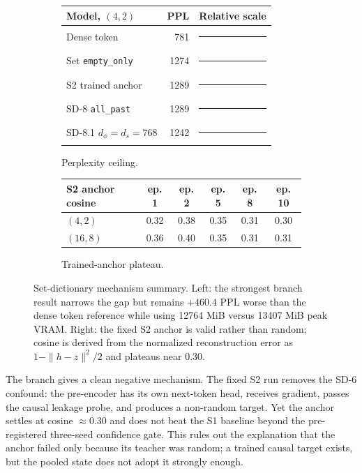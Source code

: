 \documentclass{article}
\theoremstyle{plain}
\theoremstyle{definition}
\theoremstyle{remark}
\begin{document}
\begin{figure}[t]
\centering
\begin{subfigure}{0.48\textwidth}
\centering
\scriptsize
\begin{tabular}{lrc}
\toprule
Model, $(4,2)$ & PPL & Relative scale \\
\midrule
Dense token & 781 & \rule{20mm}{2.5pt} \\
Set \texttt{empty\_only} & 1274 & \rule{33mm}{2.5pt} \\
S2 trained anchor & 1289 & \rule{33mm}{2.5pt} \\
SD-8 \texttt{all\_past} & 1289 & \rule{33mm}{2.5pt} \\
SD-8.1 $d_\phi=d_s=768$ & 1242 & \rule{32mm}{2.5pt} \\
\bottomrule
\end{tabular}
\caption{Perplexity ceiling.}
\end{subfigure}
\hfill
\begin{subfigure}{0.48\textwidth}
\centering
\scriptsize
\begin{tabular}{lccccc}
\toprule
S2 anchor cosine & ep. 1 & ep. 2 & ep. 5 & ep. 8 & ep. 10 \\
\midrule
$(4,2)$ & 0.32 & 0.38 & 0.35 & 0.31 & 0.30 \\
$(16,8)$ & 0.36 & 0.40 & 0.35 & 0.31 & 0.31 \\
\bottomrule
\end{tabular}
\caption{Trained-anchor plateau.}
\end{subfigure}
\caption{Set-dictionary mechanism summary.  Left: the strongest branch result
narrows the gap but remains $+460.4$ PPL worse than the dense token reference
while using 12764 MiB versus 13407 MiB peak VRAM.  Right: the fixed S2 anchor is
valid rather than random; cosine is derived from the normalized reconstruction
error as $1-\|h-z\|^2/2$ and plateaus near $0.30$.}
\label{fig:sd-branch-ceiling}
\end{figure}

The branch gives a clean negative mechanism.  The fixed S2 run removes the
SD-6 confound: the pre-encoder has its own next-token head, receives gradient,
passes the causal leakage probe, and produces a non-random target.  Yet the
anchor settles at cosine $\approx0.30$ and does not beat the S1 baseline beyond
the pre-registered three-seed confidence gate.  This rules out the explanation
that the anchor failed only because its teacher was random; a trained causal
target exists, but the pooled state does not adopt it strongly enough.
\end{document}
